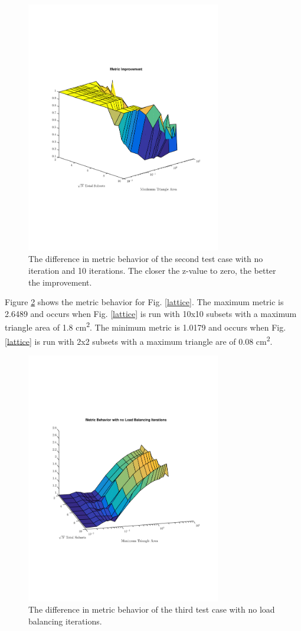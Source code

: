 \documentclass{anstrans}
\begin{document}
\begin{figure}
\centering
\includegraphics[width=85mm, trim = 2cm 5cm 0cm 5cm,clip]{figures/SameDiff.pdf}
\caption{The difference in metric behavior of the second test case with no iteration and 10 iterations. The closer the z-value to zero, the better the improvement.}
\label{samediff}
\end{figure}

Figure \ref{latticenoiter} shows the metric behavior for Fig. \ref{lattice}. The maximum metric is 2.6489 and occurs when Fig. \ref{lattice} is run with 10x10 subsets with a maximum triangle area of 1.8 cm\textsuperscript{2}. The minimum metric is 1.0179 and occurs when Fig. \ref{lattice} is run with 2x2 subsets with a maximum triangle are of 0.08 cm\textsuperscript{2}.

\begin{figure}
\centering
\includegraphics[width=85mm, trim = 0cm 5cm 0cm 5cm,clip]{figures/lattice_no_iter.pdf}
\caption{The difference in metric behavior of the third test case with no load balancing iterations.}
\label{latticenoiter}
\end{figure}
\end{document}
